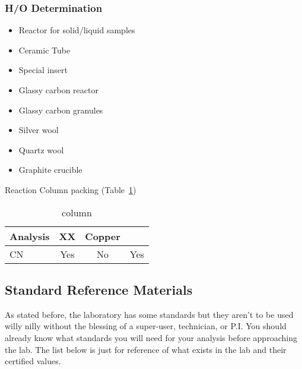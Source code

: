 \documentclass[12pt]{../SOP3}\usepackage[]{graphicx}\usepackage[]{color}
\begin{document}
\subsubsection{H/O Determination}

\begin{itemize}
  \item {Reactor for solid/liquid samples}
  \item {Ceramic Tube}
  \item {Special insert}
  \item {Glassy carbon reactor}
  \item {Glassy carbon granules}
  \item {Silver wool}
  \item {Quartz wool} 
  \item {Graphite crucible}
\end{itemize}

\NP Reaction Column packing (Table~\ref{column})

\begin{table}[h]
\label{column}
\caption{column}
\centering
\begin{tabular}{lccc} \hline
Analysis      & XX    & Copper  & \\ \hline\hline
CN            & Yes   & No      & Yes \\ \hline
\end{tabular}
\end{table}

\subsection{Standard Reference Materials} \label{subsec:Standard Reference Materials}

\NP As stated before, the laboratory has some standards but they aren't to be used willy nilly without the blessing of a super-user, technician, or P.I. You should already know what standards you will need for your analysis before approaching the lab. The list below is just for reference of what exists in the lab and their certified values.
\end{document}
